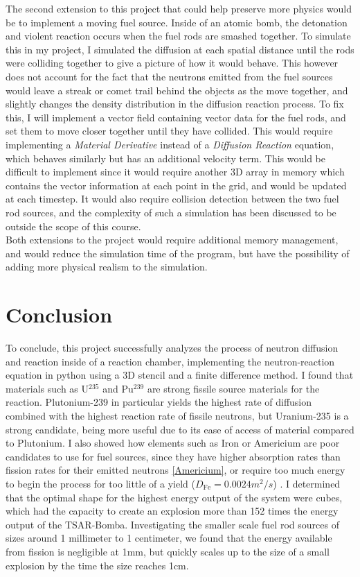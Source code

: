 \documentclass[letterpaper, 12pt]{article}
\begin{document}
      The second extension to this project that could help preserve more physics would be to implement a moving fuel source. Inside of an atomic bomb, the detonation and violent reaction occurs when the fuel rods are smashed together. To simulate this in my project, I simulated the diffusion at each spatial distance until the rods were colliding together to give a picture of how it would behave. This however does not account for the fact that the neutrons emitted from the fuel sources would leave a streak or comet trail behind the objects as the move together, and slightly changes the density distribution in the diffusion reaction process. To fix this, I will implement a vector field containing vector data for the fuel rods, and set them to move closer together until they have collided. This would require implementing a \textit{Material Derivative} instead of a \textit{Diffusion Reaction} equation, which behaves similarly but has an additional velocity term. This would be difficult to implement since it would require another 3D array in memory which contains the vector information at each point in the grid, and would be updated at each timestep. It would also require collision detection between the two fuel rod sources, and the complexity of such a simulation has been discussed to be outside the scope of this course. \\

      Both extensions to the project would require additional memory management, and would reduce the simulation time of the program, but have the possibility of adding more physical realism to the simulation. 

   \section{   Conclusion}
      To conclude, this project successfully analyzes the process of neutron diffusion and reaction inside of a reaction chamber, implementing the neutron-reaction equation in python using a 3D stencil and a finite difference method. I found that materials such as U$^{235}$ and Pu$^{239}$ are strong fissile source materials for the reaction. Plutonium-239 in particular yields the highest rate of diffusion combined with the highest reaction rate of fissile neutrons, but Uranium-235 is a strong candidate, being more useful due to its ease of access of material compared to Plutonium. I also showed how elements such as Iron or Americium are poor candidates to use for fuel sources, since they have higher absorption rates than fission rates for their emitted neutrons \ref{Americium}, or require too much energy to begin the process for too little of a yield ($D_{\text{Fe}} = 0.0024 m^2/s$) \cite{article}. I determined that the optimal shape for the highest energy output of the system were cubes, which had the capacity to create an explosion more than 152 times the energy output of the TSAR-Bomba. Investigating the smaller scale fuel rod sources of sizes around 1 millimeter to 1 centimeter, we found that the energy available from fission is negligible at 1mm, but quickly scales up to the size of a small explosion by the time the size reaches 1cm.

    
   \newpage
   \vspace{-0.5cm}
   
   
\end{document}
